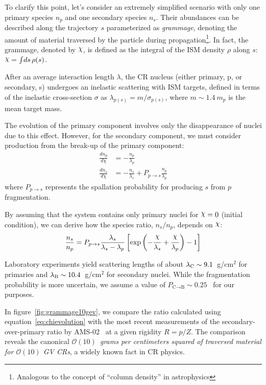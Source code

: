 To clarify this point, let's consider an extremely simplified scenario with only one primary species $n_p$ and one secondary species $n_s$. Their abundances can be described along the trajectory $s$ parameterized as \emph{grammage}, denoting the amount of material traversed by the particle during propagation\footnote{Analogous to the concept of ``column density'' in astrophysics}. 
%
In fact, the grammage, denoted by $\rchi$, is defined as the integral of the ISM density $\rho$ along $s$: $\rchi = \int \! ds \, \rho(s)$.

After an average interaction length $\lambda$, the CR nucleus (either primary, p, or secondary, s) undergoes an inelastic scattering with ISM targets, defined in terms of the inelastic cross-section $\sigma$ as $\lambda_{p(s)} = m / \sigma_{p(s)}$, where $m \sim 1.4~m_p$ is the mean target mass.

The evolution of the primary component involves only the disappearance of nuclei due to this effect. However, for the secondary component, we must consider production from the break-up of the primary component:
%
\begin{equation}
\begin{aligned}\frac{dn_p}{d\chi} & = - \frac{n_p}{\lambda_p} \\
\frac{dn_s}{d\chi} & = - \frac{n_s}{\lambda_s} + P_{p\rightarrow s} \frac{n_p}{\lambda_p}
\end{aligned}
\end{equation}
%
where $P_{p\rightarrow s}$ represents the spallation probability for producing $s$ from $p$ fragmentation.

By assuming that the system contains only primary nuclei for $\rchi = 0$ (initial condition), we can derive how the species ratio, $n_s / n_p$, depends on $\rchi$:
%
\begin{equation}
\frac{n_s}{n_p} = P_{p\rightarrow s} \frac{\lambda_s}{\lambda_s - \lambda_p} \left[ \exp\left( -\frac{\rchi}{\lambda_s} + \frac{\rchi}{\lambda_p} \right) - 1 \right]
\label{eq:chievolution}
\end{equation}

Laboratory experiments yield scattering lengths of about $\lambda_{\rm C} \sim 9.1$~g/cm$^2$ for primaries and $\lambda_{\rm B} \sim 10.4$~g/cm$^2$ for secondary nuclei. While the fragmentation probability is more uncertain, we assume a value of $P_{\textrm{C} \rightarrow \textrm{B}} \sim 0.25$~\cite{Evoli2019prd} for our purposes.

In figure~\ref{fig:grammage10gev}, we compare the ratio calculated using equation~\eqref{eq:chievolution} with the most recent measurements of the secondary-over-primary ratio by AMS-02~\cite{AMS02libeb} at a given rigidity $R = p/Z$. 
%
The comparison reveals the canonical \emph{$\mathcal O(10)$~grams per centimeters squared of traversed material for $\mathcal O(10)$ GV CRs}, a widely known fact in CR physics.

